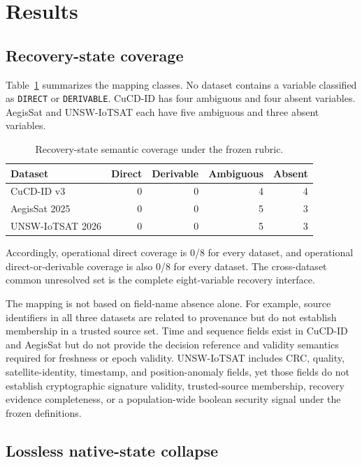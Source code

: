 \documentclass[preprint,12pt]{elsarticle}
\begin{document}
\section{Results}

\subsection{Recovery-state coverage}

Table~\ref{tab:coverage} summarizes the mapping classes. No dataset contains a variable classified as \texttt{DIRECT} or \texttt{DERIVABLE}. CuCD-ID has four ambiguous and four absent variables. AegisSat and UNSW-IoTSAT each have five ambiguous and three absent variables.

\begin{table}[htbp]
\centering
\caption{Recovery-state semantic coverage under the frozen rubric.}
\label{tab:coverage}
\begin{tabular}{lrrrr}
\toprule
Dataset & Direct & Derivable & Ambiguous & Absent \\
\midrule
CuCD-ID v3 & 0 & 0 & 4 & 4 \\
AegisSat 2025 & 0 & 0 & 5 & 3 \\
UNSW-IoTSAT 2026 & 0 & 0 & 5 & 3 \\
\bottomrule
\end{tabular}
\end{table}

Accordingly, operational direct coverage is 0/8 for every dataset, and operational direct-or-derivable coverage is also 0/8 for every dataset. The cross-dataset common unresolved set is the complete eight-variable recovery interface.

The mapping is not based on field-name absence alone. For example, source identifiers in all three datasets are related to provenance but do not establish membership in a trusted source set. Time and sequence fields exist in CuCD-ID and AegisSat but do not provide the decision reference and validity semantics required for freshness or epoch validity. UNSW-IoTSAT includes CRC, quality, satellite-identity, timestamp, and position-anomaly fields, yet those fields do not establish cryptographic signature validity, trusted-source membership, recovery evidence completeness, or a population-wide boolean security signal under the frozen definitions.

\subsection{Lossless native-state collapse}
\end{document}
